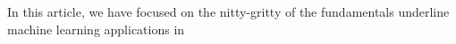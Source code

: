 In this article, we have focused on the nitty-gritty of the fundamentals underline machine learning applications in 